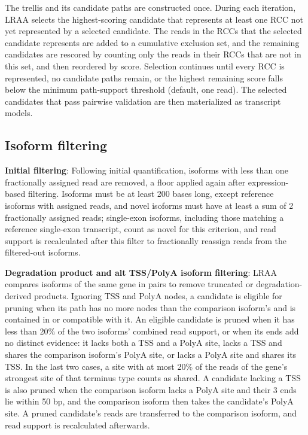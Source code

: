 The trellis and its candidate paths are constructed once. During each iteration, LRAA selects the highest-scoring candidate that represents at least one RCC not yet represented by a selected candidate. The reads in the RCCs that the selected candidate represents are added to a cumulative exclusion set, and the remaining candidates are rescored by counting only the reads in their RCCs that are not in this set, and then reordered by score. Selection continues until every RCC is represented, no candidate paths remain, or the highest remaining score falls below the minimum path-support threshold (default, one read). The selected candidates that pass pairwise validation are then materialized as transcript models.

\subsection{Isoform filtering}\label{isoform-filtering}

\textbf{Initial filtering}: Following initial quantification, isoforms with less than one fractionally assigned read are removed, a floor applied again after expression-based filtering. Isoforms must be at least 200 bases long, except reference isoforms with assigned reads, and novel isoforms must have at least a sum of 2 fractionally assigned reads; single-exon isoforms, including those matching a reference single-exon transcript, count as novel for this criterion, and read support is recalculated after this filter to fractionally reassign reads from the filtered-out isoforms.

\textbf{Degradation product and alt TSS/PolyA isoform filtering}: LRAA compares isoforms of the same gene in pairs to remove truncated or degradation-derived products. Ignoring TSS and PolyA nodes, a candidate is eligible for pruning when its path has no more nodes than the comparison isoform's and is contained in or compatible with it. An eligible candidate is pruned when it has less than 20\% of the two isoforms' combined read support, or when its ends add no distinct evidence: it lacks both a TSS and a PolyA site, lacks a TSS and shares the comparison isoform's PolyA site, or lacks a PolyA site and shares its TSS. In the last two cases, a site with at most 20\% of the reads of the gene's strongest site of that terminus type counts as shared. A candidate lacking a TSS is also pruned when the comparison isoform lacks a PolyA site and their 3\p{} ends lie within 50 bp, and the comparison isoform then takes the candidate's PolyA site. A pruned candidate's reads are transferred to the comparison isoform, and read support is recalculated afterwards.

